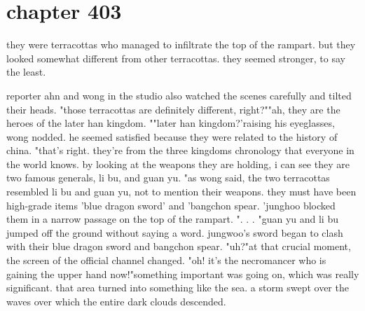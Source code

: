 \section{chapter 403}

they were terracottas who managed to infiltrate the top of the rampart.
 but they looked somewhat different from other terracottas.
 they seemed stronger, to say the least.





reporter ahn and wong in the studio also watched the scenes carefully and tilted their heads.
"those terracottas are definitely different, right?""ah, they are the heroes of the later han kingdom.
""later han kingdom?'raising his eyeglasses, wong nodded.
 he seemed satisfied because they were related to the history of china.
"that's right.
 they're from the three kingdoms chronology that everyone in the world knows.
 by looking at the weapons they are holding, i can see they are two famous generals, li bu, and guan yu.
"as wong said, the two terracottas resembled li bu and guan yu, not to mention their weapons.
they must have been high-grade items 'blue dragon sword' and 'bangchon spear.
'junghoo blocked them in a narrow passage on the top of the rampart.
 ".
.
.
"guan yu and li bu jumped off the ground without saying a word.
 jungwoo's sword began to clash with their blue dragon sword and bangchon spear.
"uh?"at that crucial moment, the screen of the official channel changed.
"oh! it's the necromancer who is gaining the upper hand now!"something important was going on, which was really significant.
that area turned into something like the sea.
 a storm swept over the waves over which the entire dark clouds descended.

